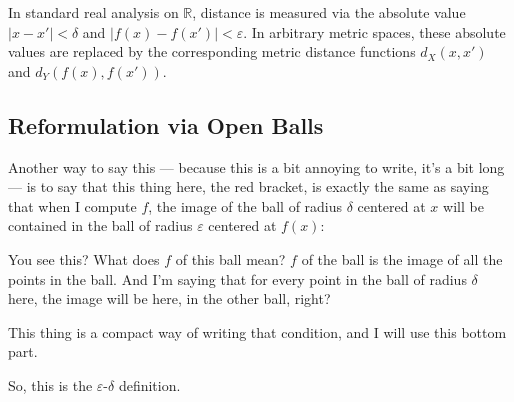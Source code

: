 \begin{content}

\begin{steps}
In standard real analysis on $\mathbb{R}$, distance is measured via the absolute value $|x - x'| < \delta$ and $|f(x) - f(x')| < \varepsilon$. In arbitrary metric spaces, these absolute values are replaced by the corresponding metric distance functions $d_X(x, x')$ and $d_Y(f(x), f(x'))$.
\end{steps}
\end{content}

\subsection{Reformulation via Open Balls}

\begin{speech}[01:02:43 - 01:03:44]
Another way to say this --- because this is a bit annoying to write, it's a bit long --- is to say that this thing here, the red bracket, is exactly the same as saying that when I compute $f$, the image of the ball of radius $\delta$ centered at $x$ will be contained in the ball of radius $\varepsilon$ centered at $f(x)$: 
\end{speech}

\begin{speech}[01:03:44 - 01:04:19]
You see this? What does $f$ of this ball mean? $f$ of the ball is the image of all the points in the ball. And I'm saying that for every point in the ball of radius $\delta$ here, the image will be here, in the other ball, right?

This thing is a compact way of writing that condition, and I will use this bottom part.

So, this is the $\varepsilon$-$\delta$ definition.
\end{speech}

